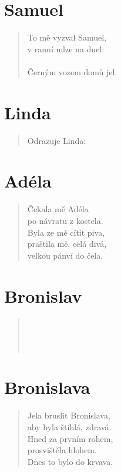\section*{Samuel}
\begin{verse}
To mě vyzval Samuel,\\
v ranní mlze na duel:\\
\\
Černým vozem domů jel.
\end{verse}

\section*{Linda}
\begin{verse}
Odrazuje Linda:\\
\end{verse}

\section*{Adéla}
\begin{verse}
Čekala mě Adéla\\
po návratu z kostela.\\
Byla ze mě cítit piva,\\
praštila mě, celá divá,\\
velkou pánví do čela.
\end{verse}

\section*{Bronislav}
\begin{verse}
\\
\\
\\
\end{verse}

\section*{Bronislava}
\begin{verse}
Jela bruslit Bronislava,\\
aby byla štíhlá, zdravá.\\
Hned za prvním rohem,\\
prosvištěla hlohem.\\
Dnes to bylo do krvava.
\end{verse}

